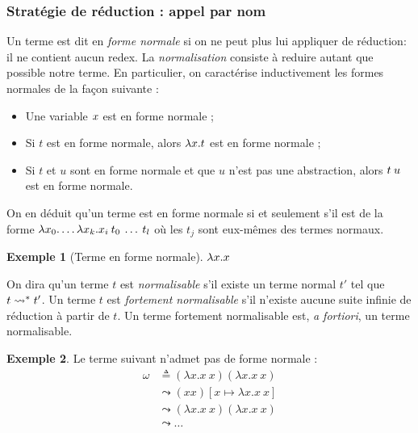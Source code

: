 \documentclass {article}
\theoremstyle{definition}
\newtheorem{example}{Exemple}
\theoremstyle{remark}
\newcommand{\todo}[1]{\textcolor{red}{#1}}
\begin{document}
\subsubsection{Stratégie de réduction : appel par nom}

\label{reduction:call_by_name}
Un terme est dit en \emph{forme
  normale} si on ne peut plus lui
appliquer de réduction: il ne contient aucun redex. La \emph{normalisation}
consiste à reduire autant que possible notre terme. En
particulier, on caractérise inductivement les formes normales de la
façon suivante :
%
\begin{itemize}
\item Une variable \(x\) est en forme normale ;
\item Si \(t\) est en forme normale, alors \(\lambda x. t\) est en
  forme normale ;
\item Si \(t\) et \(u\) sont en forme normale et que \(u\) n'est pas
  une abstraction, alors \(t\:u\) est en forme normale.
\end{itemize}

On en déduit qu'un terme est en forme normale si et seulement s'il est
de la forme
\(\lambda x_0. \ldots\lambda x_k. x_i\:t_0\:\ldots\:t_l\)
où les \(t_j\) sont eux-mêmes des termes normaux.

\begin{example}[Terme en forme normale]
  \todo{\(\lambda x. x\)}
\end{example}

On dira qu'un terme \(t\) est \emph{normalisable} s'il existe un terme
normal \(t'\) tel que \(t \leadsto^{*} t'\). Un terme \(t\) est
\emph{fortement normalisable} s'il n'existe aucune suite infinie de
réduction à partir de \(t\). Un terme fortement normalisable est,
\textit{a fortiori}, un terme normalisable.

\begin{example}
 \label{paradoxe}
  Le terme suivant n'admet pas de forme normale :
  \begin{align*}
    \omega &\triangleq (\lambda x. x\: x) (\lambda x. x\: x) \\
           &\leadsto (x x)[x \mapsto \lambda x. x\: x] \\
           &\leadsto (\lambda x. x\: x) (\lambda x. x\: x) \\
           &\leadsto \ldots \\
  \end{align*}
\end{example}
\end{document}
